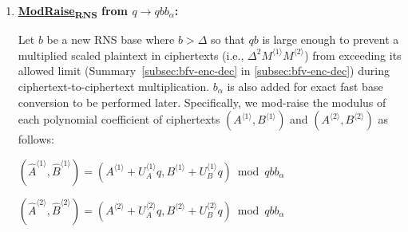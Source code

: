 \begin{enumerate}

\item \textbf{\underline{\textsf{ModRaise\textsubscript{RNS}}} from $q \rightarrow qbb_\alpha$:}

Let $b$ be a new RNS base where $b > \Delta$ so that $qb$ is large enough to prevent a multiplied scaled plaintext in ciphertexts (i.e., $\Delta^2M^{\langle 1 \rangle}M^{\langle 2 \rangle}$) from exceeding its allowed limit (Summary~\ref*{subsec:bfv-enc-dec} in \autoref{subsec:bfv-enc-dec}) during ciphertext-to-ciphertext multiplication. $b_\alpha$ is also added for exact fast base conversion to be performed later. 
Specifically, we mod-raise the modulus of each polynomial coefficient of ciphertexts $(A^{\langle 1 \rangle}, B^{\langle 1 \rangle})$ and $(A^{\langle 2 \rangle}, B^{\langle 2 \rangle})$ as follows:



 



$(\hat{A}^{\langle 1 \rangle}, \hat{B}^{\langle 1 \rangle}) = (A^{\langle 1 \rangle} + U_A^{\langle 1 \rangle}q, B^{\langle 1 \rangle} + U_B^{\langle 1 \rangle}q) \bmod qbb_\alpha$

$(\hat{A}^{\langle 2 \rangle}, \hat{B}^{\langle 2 \rangle}) =(A^{\langle 2 \rangle} + U_A^{\langle 2 \rangle}q, B^{\langle 2 \rangle} + U_B^{\langle 2 \rangle}q) \bmod qbb_\alpha$

$ $


\end{enumerate}
